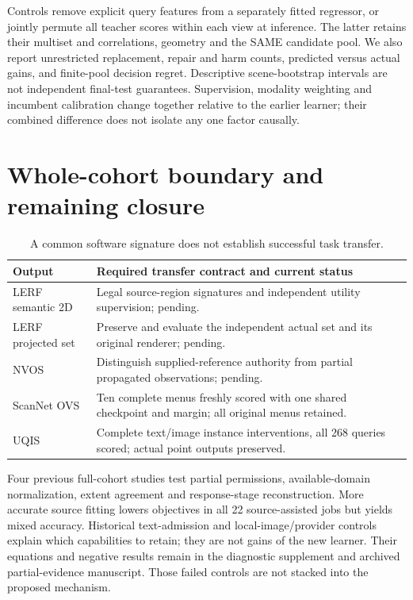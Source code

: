 \documentclass[10pt]{article}
\begin{document}
Controls remove explicit query features from a separately fitted regressor, or
jointly permute all teacher scores within each view at inference. The latter
retains their multiset and correlations, geometry and the SAME candidate pool.
We also report unrestricted replacement, repair and harm counts, predicted
versus actual gains, and finite-pool decision regret. Descriptive scene-bootstrap
intervals are not independent final-test guarantees. Supervision, modality
weighting and incumbent calibration change together relative to the earlier
learner; their combined difference does not isolate any one factor causally.

\section{Whole-cohort boundary and remaining closure}
\begin{table}[ht]
\centering\small
\begin{tabular}{p{.23\linewidth}p{.69\linewidth}}
\toprule
Output & Required transfer contract and current status \\
\midrule
LERF semantic 2D & Legal source-region signatures and independent utility supervision; pending. \\
LERF projected set & Preserve and evaluate the independent actual set and its original renderer; pending. \\
NVOS & Distinguish supplied-reference authority from partial propagated observations; pending. \\
ScanNet OVS & Ten complete menus freshly scored with one shared checkpoint and margin; all original menus retained. \\
UQIS & Complete text/image instance interventions, all 268 queries scored; actual point outputs preserved. \\
\bottomrule
\end{tabular}
\caption{A common software signature does not establish successful task transfer.}
\end{table}

Four previous full-cohort studies test partial permissions, available-domain
normalization, extent agreement and response-stage reconstruction. More accurate
source fitting lowers objectives in all 22 source-assisted jobs but yields mixed
accuracy. Historical text-admission and local-image/provider controls explain
which capabilities to retain; they are not gains of the new learner. Their
equations and negative results remain in the diagnostic supplement and archived
partial-evidence manuscript. Those failed controls are not stacked into the
proposed mechanism.
\end{document}
